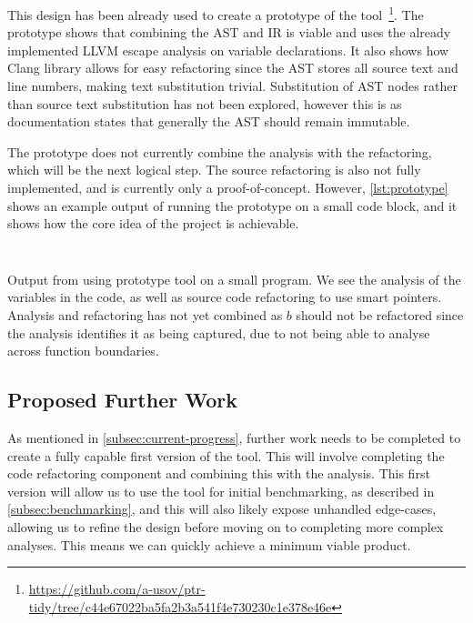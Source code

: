 \documentclass{proposal}
\begin{document}
    This design has been already used to create a prototype of the tool~\footnote{\url{https://github.com/a-usov/ptr-tidy/tree/c44e67022ba5fa2b3a541f4e730230c1e378e46e}}.
    The prototype shows that combining the AST and IR is viable and uses the already implemented LLVM escape analysis on variable declarations.
    It also shows how Clang library allows for easy refactoring since the AST stores all source text and line numbers, making text substitution trivial.
    Substitution of AST nodes rather than source text substitution has not been explored, however this is as documentation states that generally the AST should remain immutable.

    The prototype does not currently combine the analysis with the refactoring, which will be the next logical step.
    The source refactoring is also not fully implemented, and is currently only a proof-of-concept.
    However, \autoref{lst:prototype} shows an example output of running the prototype on a small code block, and it shows how the core idea of the project is achievable.

    \begin{listing}
        \inputminted{c++}{code/prototype-input.cpp}
        \inputminted{text}{code/prototype-output.txt}
        \caption{Output from using prototype tool on a small program. We see the analysis of the variables in the code, as well as source code refactoring to use smart pointers. Analysis and refactoring has not yet combined as $b$ should not be refactored since the analysis identifies it as being captured, due to not being able to analyse across function boundaries.}
        \label{lst:prototype}
    \end{listing}

    \subsection{Proposed Further Work}\label{subsec:proposed-further-work}

    As mentioned in \autoref{subsec:current-progress}, further work needs to be completed to create a fully capable first version of the tool.
    This will involve completing the code refactoring component and combining this with the analysis.
    This first version will allow us to use the tool for initial benchmarking, as described in \autoref{subsec:benchmarking}, and this will also likely expose unhandled edge-cases, allowing us to refine the design before moving on to completing more complex analyses.
    This means we can quickly achieve a minimum viable product.
\end{document}
